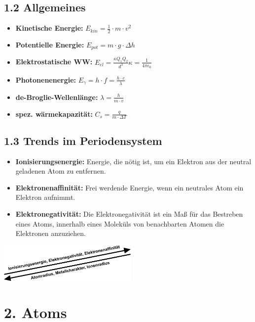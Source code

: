 \begin{multicols*}{4}
\subsection{1.2 Allgemeines}{

    \begin{itemize}[noitemsep, leftmargin=*]
        \item \textbf{Kinetische Energie:} $E_{kin} = \frac{1}{2} \cdot m \cdot v^2$
        \item \textbf{Potentielle Energie:} $E_{pot} = m \cdot g \cdot \Delta h$
        \item \textbf{Elektrostatische WW:} $E_{el}=\frac{\kappa Q_1Q_2}{d^3}$\quad $\kappa = \frac{1}{4\pi \epsilon_0}$
        \item \textbf{Photonenenergie: } $E_\gamma = h\cdot f = \frac{h\cdot c}{\lambda}$
        \item \textbf{de-Broglie-Wellenlänge: } $\lambda = \frac{h}{m\cdot v}$
        \item \textbf{spez. wärmekapazität: }$C_s=\frac{q}{m\cdot\Delta T}$
    \end{itemize}
}


\subsection{1.3 Trends im Periodensystem}{
\begin{itemize}[noitemsep, leftmargin=*]
    \item \textbf{Ionisierungsenergie: }Energie, die nötig ist, um ein Elektron aus der neutral geladenen Atom zu entfernen.
    \item \textbf{Elektronenaffinität:} Frei werdende Energie, wenn ein neutrales Atom ein Elektron aufnimmt.
    \item \textbf{Elektronegativität:} Die Elektronegativität ist ein Maß für das Bestreben eines Atoms, innerhalb eines Moleküls von benachbarten Atomen die Elektronen anzuziehen.

    
\end{itemize}\includegraphics[width = 68mm]{Bilder/TrendsimPSE.png}
}

\section{2. Atoms}

\end{multicols*}
